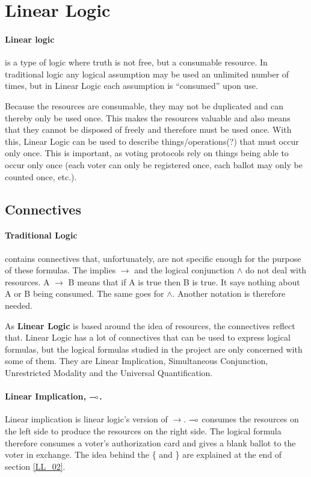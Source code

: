 \section{Linear Logic}
\label{LL}

\paragraph{Linear logic} is a type of logic where truth is not free, but a consumable resource. In traditional logic any logical assumption may be used an unlimited number of times, but in Linear Logic each assumption is “consumed” upon use.

Because the resources are consumable, they may not be duplicated and can thereby only be used once. This makes the resources valuable and also means that they cannot be disposed of freely and therefore must be used once. With this, Linear Logic can be used to describe things/operations(?) that must occur only once. This is important, as voting protocols rely on things being able to occur only once (each voter can only be registered once, each ballot may only be counted once, etc.).

\subsection{Connectives}
\label{LL_01}

\paragraph{Traditional Logic} contains connectives that, unfortunately, are not specific enough for the purpose of these formulas. The implies $\rightarrow$ and the logical conjunction $\wedge$ do not deal with resources. A $\rightarrow$ B means that if A is true then B is true. It says nothing about A or B being consumed. The same goes for $\wedge$. Another notation is therefore needed. 

As \textbf{Linear Logic} is based around the idea of resources, the connectives reflect that. Linear Logic has a lot of connectives that can be used to express logical formulas, but the logical formulas studied in the project are only concerned with some of them. They are Linear Implication, Simultaneous Conjunction, Unrestricted Modality and the Universal Quantification.

\paragraph{Linear Implication, $\multimap$.} Linear implication is linear logic’s version of $\rightarrow$. $\multimap$ consumes the resources on the left side to produce the resources on the right side. The logical formula
therefore consumes a voter’s authorization card and gives a blank ballot to the voter in exchange. The idea behind the \{ and \} are explained at the end of section \ref{LL_02}.

